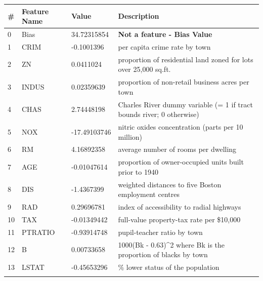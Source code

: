 \documentclass[10pt]{article}
\begin{document}
\def\arraystretch{1.5}
\label{Housing Features}
\label{sec:hfs}
\begin{tabular}{llll}
\textbf{\#} & \textbf{Feature Name} & \textbf{Value} & \textbf{Description}                                                           \\ \hline
0           & Bias                  & 34.72315854    & \textbf{Not a feature - Bias Value}                                  \\ \hline
1           & CRIM                  & -0.1001396     & per capita crime rate by town                                                  \\ \hline
2           & ZN                    & 0.0411024      & proportion of residential land zoned for lots over 25,000 sq.ft.               \\ \hline
3           & INDUS                 & 0.02359639     & proportion of non-retail business acres per town                               \\ \hline
4           & CHAS                  & 2.74448198     & Charles River dummy variable (= 1 if tract bounds river; 0 otherwise)          \\ \hline
5           & NOX                   & -17.49103746   & nitric oxides concentration (parts per 10 million)                             \\ \hline
6           & RM                    & 4.16892358     & average number of rooms per dwelling                                           \\ \hline
7           & AGE                   & -0.01047614    & proportion of owner-occupied units built prior to 1940                         \\ \hline
8           & DIS                   & -1.4367399     & weighted distances to five Boston employment centres                           \\ \hline
9           & RAD                   & 0.29696781     & index of accessibility to radial highways                                      \\ \hline
10          & TAX                   & -0.01349442    & full-value property-tax rate per \$10,000                                      \\ \hline
11          & PTRATIO               & -0.93914748    & pupil-teacher ratio by town                                                    \\ \hline
12          & B                     & 0.00733658     & 1000(Bk - 0.63)\textasciicircum 2 where Bk is the proportion of blacks by town \\ \hline
13          & LSTAT                 & -0.45653296    & \% lower status of the population                                              \\ \hline
\\
\end{tabular}
\def\arraystretch{1}
\end{document}
